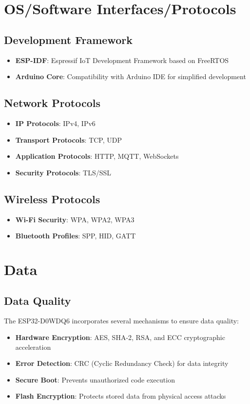 \section{OS/Software Interfaces/Protocols}

\subsection{Development Framework}
\begin{itemize}
	\item \textbf{ESP-IDF}: Espressif IoT Development Framework based on FreeRTOS
	\item \textbf{Arduino Core}: Compatibility with Arduino IDE for simplified development \cite{Babiuch:2019}
\end{itemize}

\subsection{Network Protocols}
\begin{itemize}
	\item \textbf{IP Protocols}: IPv4, IPv6
	\item \textbf{Transport Protocols}: TCP, UDP
	\item \textbf{Application Protocols}: HTTP, MQTT, WebSockets
	\item \textbf{Security Protocols}: TLS/SSL
\end{itemize}

\subsection{Wireless Protocols}
\begin{itemize}
	\item \textbf{Wi-Fi Security}: WPA, WPA2, WPA3
	\item \textbf{Bluetooth Profiles}: SPP, HID, GATT \cite{Espressif:2023}
\end{itemize}

\section{Data}

\subsection{Data Quality}
The ESP32-D0WDQ6 incorporates several mechanisms to ensure data quality:
\begin{itemize}
	\item \textbf{Hardware Encryption}: AES, SHA-2, RSA, and ECC cryptographic acceleration
	\item \textbf{Error Detection}: CRC (Cyclic Redundancy Check) for data integrity
	\item \textbf{Secure Boot}: Prevents unauthorized code execution
	\item \textbf{Flash Encryption}: Protects stored data from physical access attacks \cite{Espressif:2023}
\end{itemize}

